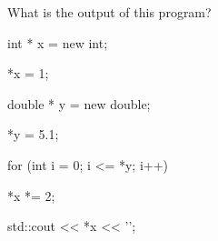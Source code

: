 What is the output of this program?



\begin{consolethree}[escapeinside=||]

int * x = new int;

*x = 1;

double * y = new double;



*y = 5.1;



for (int i = 0; i <= *y; i++)

{

    *x *= 2;

}

std::cout << *x << '\n';

\end{consolethree}

